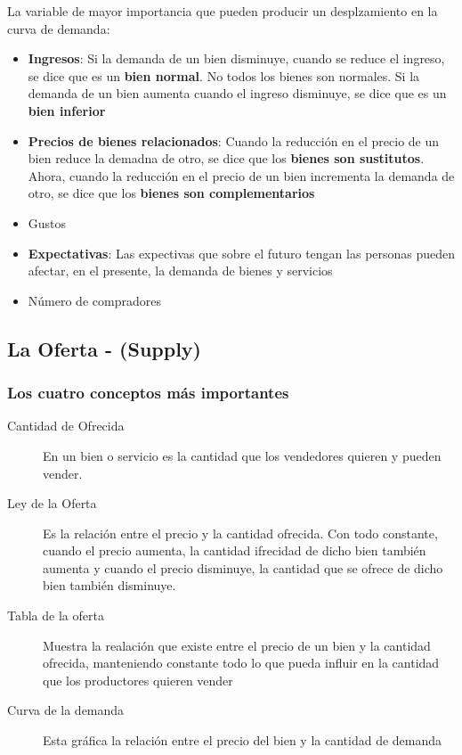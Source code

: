 \newpage

La variable de mayor importancia que pueden producir un desplzamiento en la curva de demanda:
\begin{itemize}
\item{{\bf Ingresos}: Si la demanda de un bien disminuye, cuando se reduce el ingreso, se dice que es un {\bf bien normal}. No todos los bienes son normales. Si la demanda de un bien aumenta cuando el ingreso disminuye, se dice que es un {\bf bien inferior}}
\item{{\bf Precios de bienes relacionados}: Cuando la reducción en el precio de un bien reduce la demadna de otro, se dice que los {\bf bienes son sustitutos}. Ahora, cuando la reducción en el precio de un bien incrementa la demanda de otro, se dice que los {\bf bienes son complementarios}}
\item{Gustos}
\item{{\bf Expectativas}: Las expectivas que sobre el futuro tengan las personas pueden afectar, en el presente, la demanda de bienes y servicios}
\item{Número de compradores}
\end{itemize}

\subsection{La Oferta - (Supply)}

\subsubsection{Los cuatro conceptos más importantes}
\begin{description}
\item[Cantidad de Ofrecida] En un bien o servicio es la cantidad que los vendedores quieren y pueden vender.
\item[Ley de la Oferta] Es la relación entre el precio y la cantidad ofrecida. Con todo constante, cuando el precio aumenta, la cantidad ifrecidad de dicho bien también aumenta y cuando el precio disminuye, la cantidad que se ofrece de dicho bien también disminuye.
\item[Tabla de la oferta] Muestra la realación que existe entre el precio de un bien y la cantidad ofrecida, manteniendo constante todo lo que pueda influir en la cantidad que los productores quieren vender
\item[Curva de la demanda] Esta gráfica la relación entre el precio del bien y la cantidad de demanda  
\end{description}
